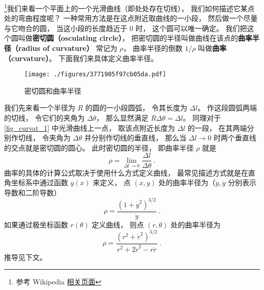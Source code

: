 

\footnote{参考 Wikipedia \href{https://en.wikipedia.org/wiki/Curvature}{相关页面}}我们来看一个平面上的一个光滑曲线（即处处存在切线）， 我们如何描述它某点处的弯曲程度呢？ 一种常用方法是在这点附近取曲线的一小段， 然后做一个尽量与它吻合的圆， 当这小段的长度趋近于 0 时， 这个圆可以唯一确定。 我们把这个圆叫做\textbf{密切圆（osculating circle）}， 把密切圆的半径叫做曲线在该点的\textbf{曲率半径（radius of curvature）} 常记为 $\rho$， 曲率半径的倒数 $1/\rho$ 叫做\textbf{曲率（curvature）}。 下面我们来具体定义曲率半径。
\begin{figure}[ht]
\centering
\texttt{[image: ./figures/3771905f97cb05da.pdf]}
\caption{密切圆和曲率半径} \label{fig_curvat_1}
\end{figure}

我们先来看一个半径为 $R$ 的圆的一小段圆弧， 令其长度为 $\Delta l$。 作这段圆弧两端的切线， 令它们的夹角为 $\Delta \theta$， 那么显然满足 $R \Delta\theta = \Delta l$。 同理对于\autoref{fig_curvat_1} 中光滑曲线上一点， 取该点附近长度为 $\Delta l$ 的一段， 在其两端分别作切线， 令夹角为 $\Delta\theta$ 并分别作切线的垂直线， 那么当 $\Delta l \to 0$ 时两个垂直线的交点就是密切圆的圆心。 此时密切圆的半径， 即曲率半径 $\rho$ 就是
\begin{equation}\label{eq_curvat_3}
\rho = \lim_{\Delta l \to 0} \frac{\Delta l}{\Delta \theta}~.
\end{equation}
曲率的具体的计算公式取决于使用什么方式定义曲线， 最常见描述方式就是在直角坐标系中通过函数 $y(x)$ 来定义， 点 $(x, y)$ 处的曲率半径为（$\dot y, \ddot y$ 分别表示导数和二阶导数）
\begin{equation}
\rho = \frac{(1 + \dot y^2)^{3/2}}{\ddot y}~.
\end{equation}
如果通过极坐标函数 $r(\theta)$ 定义曲线， 则点 $(r, \theta)$ 处的曲率半径为
\begin{equation}
\rho = \frac{(r^2 + \dot r^2)^{3/2}}{r^2 + 2\dot r^2 - r\ddot r}~.
\end{equation}
推导见下文。

